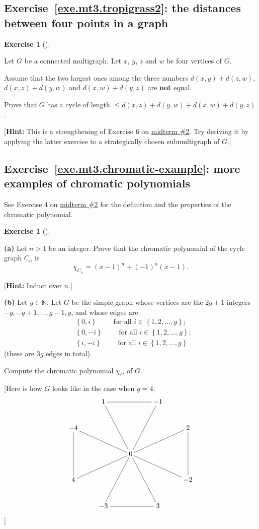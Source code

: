 \documentclass[numbers=enddot,12pt,final,onecolumn,notitlepage]{scrartcl}%
\makeatletter
\newcounter{exer}
\theoremstyle{definition}
\newtheorem{exmp}[exer]{Exercise}
\newenvironment{exercise}[1][]
{\begin{exmp}[#1]\begin{leftbar}}
{\end{leftbar}\end{exmp}}
\newcommand{\NN}{\mathbb{N}}
\newcommand{\set}[1]{\left\{ #1 \right\}}
\newcommand{\tup}[1]{\left( #1 \right)}
\newcommand{\are}{\ar@{-}}
\makeatother
\begin{document}
\subsection{Exercise~\ref{exe.mt3.tropigrass2}:
the distances between four points in a graph}

\begin{exercise} \label{exe.mt3.tropigrass2}
Let $G$ be a connected multigraph.
Let $x$, $y$, $z$ and $w$ be four vertices of $G$.

Assume that the two largest ones among the three numbers
$d \tup{x, y} + d \tup{z, w}$,
$d \tup{x, z} + d \tup{y, w}$ and
$d \tup{x, w} + d \tup{y, z}$
are \textbf{not} equal.

Prove that $G$ has a cycle of length
$\leq d \tup{x, z} + d \tup{y, w} + d \tup{x, w} + d \tup{y, z}$.

[\textbf{Hint:} This is a strengthening of Exercise 6 on
\href{http://www.cip.ifi.lmu.de/~grinberg/t/17s/mt2s.pdf}{midterm \#2}.
Try deriving it by applying the latter exercise to a strategically
chosen submultigraph of $G$.]
\end{exercise}

\subsection{Exercise~\ref{exe.mt3.chromatic-example}:
more examples of chromatic polynomials}

See Exercise 4 on
\href{http://www.cip.ifi.lmu.de/~grinberg/t/17s/mt2s.pdf}{midterm \#2}
for the definition and the properties of the chromatic polynomial.

\Needspace{8cm}
\begin{exercise} \label{exe.mt3.chromatic-example}
\textbf{(a)} Let $n > 1$ be an integer.
Prove that the chromatic polynomial of the cycle graph
$C_n$ is
\[
\chi_{C_n} = \tup{x-1}^n + \tup{-1}^n \tup{x-1} .
\]

[\textbf{Hint:} Induct over $n$.]

\textbf{(b)} Let $g \in \NN$.
Let $G$ be the simple graph whose vertices are the $2g+1$
integers $-g, -g+1, \ldots, g-1, g$, and whose edges are
\begin{align*}
& \set{0, i} \qquad \text{ for all } i \in \set{1, 2, \ldots, g}; \\
& \set{0, -i} \qquad \text{ for all } i \in \set{1, 2, \ldots, g}; \\
& \set{i, -i} \qquad \text{ for all } i \in \set{1, 2, \ldots, g}
\end{align*}
(these are $3g$ edges in total).

Compute the chromatic polynomial $\chi_G$ of $G$.

[Here is how $G$ looks like in the case when $g = 4$:
\[
\xymatrix{
& 1 \are[ddr] \are[rr] & & -1 \are[ddl] \\
-4 \are[dd] \are[drr] & & & & 2 \are[dd] \\
& & 0 \are[urr] \are[drr] \are[dll] \are[ddl] \are[ddr] \\
4 & & & & -2 \\
& -3 \are[rr] & & 3
}
\]
]
\end{exercise}
\end{document}
